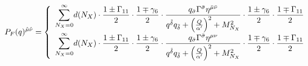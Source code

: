 \begin{equation}
 P_F(q)^{{\hat \mu}{\hat \nu}} =
 \left\{
 \begin{array}{l}
  \displaystyle{\sum_{N_X=0}^\infty} d(N_X) \cdot
   {{1 \pm \Gamma_{11}} \over 2} \cdot
   {{1 \mp \gamma_6} \over 2} \cdot
  {{q_{\bar \sigma} \Gamma^{\bar \sigma} \eta^{{\bar \mu}{\bar \nu}}}
   \over
   {
   q^{\tilde \delta} q_{\tilde \delta}
   + \left( {Q \over {\alpha'}} \right)^2 + M_{N_X}^2
   }} \cdot
   {{1 \pm \gamma_6} \over 2} \cdot
   {{1 \mp \Gamma_{11}} \over 2}
 \\
  \displaystyle{\sum_{N_X=0}^\infty} d(N_X) \cdot
   {{1 \pm \Gamma_{11}} \over 2} \cdot
   {{1 \pm \gamma_6} \over 2} \cdot
  {{q_{\bar \sigma} \Gamma^{\bar \sigma} \eta^{{\mu}{\nu}}}
   \over
   {
   q^{\tilde \delta} q_{\tilde \delta}
   + \left( {Q \over {\alpha'}} \right)^2 + M_{N_X}^2
   }} \cdot
   {{1 \mp \gamma_6} \over 2} \cdot
   {{1 \mp \Gamma_{11}} \over 2}
 \end{array}
 \right.
\label{propagator-final}
\end{equation}

